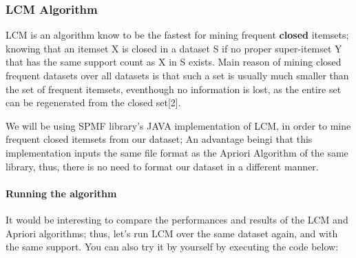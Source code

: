 \documentclass[11pt]{article}
\begin{document}
\hypertarget{lcm-algorithm}{%
\subsubsection{LCM Algorithm}\label{lcm-algorithm}}

LCM is an algorithm know to be the fastest for mining frequent
\textbf{closed} itemsets; knowing that an itemset X is closed in a
dataset S if no proper super-itemset Y that has the same support count
as X in S exists. Main reason of mining closed frequent datasets over
all datasets is that such a set is usually much smaller than the set of
frequent itemsets, eventhough no information is lost, as the entire set
can be regenerated from the closed set{[}2{]}.

We will be using SPMF library's JAVA implementation of LCM, in order to
mine frequent closed itemsets from our dataset; An advantage beingi that
this implementation inputs the same file format as the Apriori Algorithm
of the same library, thus, there is no need to format our dataset in a
different manner.

\hypertarget{running-the-algorithm}{%
\paragraph{Running the algorithm}\label{running-the-algorithm}}

It would be interesting to compare the performances and results of the
LCM and Apriori algorithms; thus, let's run LCM over the same dataset
again, and with the same support. You can also try it by yourself by
executing the code below:
\end{document}
